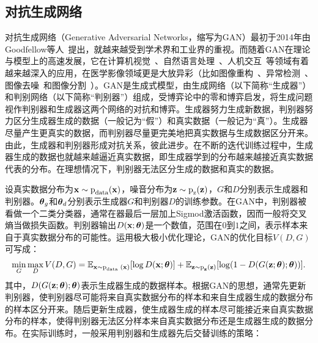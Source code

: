 \subsection{对抗生成网络}\label{subsec:gan_introduction}
对抗生成网络（Generative Adversarial Networks，缩写为GAN）最初于2014年由Goodfellow等人~\cite{goodfellow2014generative}提出，就越来越受到学术界和工业界的重视。而随着GAN在理论与模型上的高速发展，它在计算机视觉~\cite{zhu2017unpaired}、自然语言处理~\cite{qin2018dsgan}、人机交互~\cite{qiao2018emotional}等领域有着越来越深入的应用，在医学影像领域更是大放异彩（比如图像重构~\cite{bhadra2020medical}、异常检测~\cite{Kohl2017AdversarialNF}、图像去噪~\cite{Yang2018LowDoseCI}和图像分割~\cite{Han2018SpineGANSS}）。GAN是生成式模型，由生成网络（以下简称“生成器”）和判别网络（以下简称“判别器”）组成，受博弈论中的零和博弈启发，将生成问题视作判别器和生成器这两个网络的对抗和博弈。生成器努力生成新数据，判别器努力区分生成器生成的数据（一般记为“假”）和真实数据（一般记为“真”）。生成器尽量产生更真实的数据，而判别器尽量更完美地把真实数据与生成数据区分开来。由此，生成器和判别器形成对抗关系，彼此进步。在不断的迭代训练过程中，生成器生成的数据也就越来越逼近真实数据，即生成器学到的分布越来越接近真实数据代表的分布。在理想情况下，判别器无法区分生成的数据和真实的数据。

设真实数据分布为$\mathbf{x}\sim \text{p}_{\text{data}}(\mathbf{x})$，噪音分布为$\mathbf{z}\sim \text{p}_{\text{z}}(\mathbf{z})$，$G$和$D$分别表示生成器和判别器。$\mbox{\boldmath $\theta$}_{g}$和$\mbox{\boldmath $\theta$}_{d}$分别表示生成器$G$和判别器$D$的训练参数。在GAN中，判别器被看做一个二类分类器，通常在器最后一层加上Sigmod激活函数，因而一般将交叉熵当做损失函数。判别器输出$D(\mathbf{x};\mbox{\boldmath $\theta$})$是一个数值，范围在$0$到$1$之间，表示样本来自于真实数据分布的可能性。运用极大极小优化理论，GAN的优化目标$V(D, G)$可写成：
\begin{eqnarray*}\label{equ:gan_loss_func}
\min _{G} \max _{D} V(D, G)=\mathbb{E}_{ \mathbf{x} \sim \text{p}_{\text {data }}(\mathbf{x})}[\log D(\mathbf{x};\mbox{\boldmath $\theta$})]+\mathbb{E}_{\mathbf{z} \sim \text{p}_{\mathbf{z}}(\mathbf{z})}[\log (1-D(G(\mathbf{z};\mbox{\boldmath $\theta$});\mbox{\boldmath $\theta$}))].
\end{eqnarray*}
\noindent 其中，$D(G(\mathbf{z};\mbox{\boldmath $\theta$});\mbox{\boldmath $\theta$})$表示生成器生成的数据样本。根据GAN的思想，通常先更新判别器，使判别器尽可能将来自真实数据分布的样本和来自生成器生成的数据分布的样本区分开来。随后更新生成器，使生成器生成的样本尽可能接近来自真实数据分布的样本，使得判别器无法区分样本来自真实数据分布还是生成器生成的数据分布。在实际训练时，一般采用判别器和生成器先后交替训练的策略：


